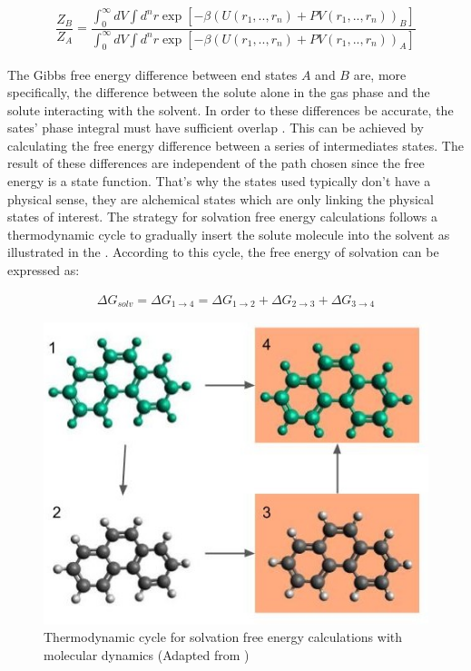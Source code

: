 \begin{equation}
\label{eq:partiso}
\begin{aligned}
\dfrac{Z_{B}}{Z_{A}} = \dfrac{\int_{0}^{\infty} dV \int d^{n}r \exp \left[ -\beta \left(U(r_{1},..,r_{n}) + PV(r_{1},..,r_{n}) \right)_{B} \right]}{\int_{0}^{\infty} dV \int d^{n}r \exp \left[ -\beta \left(U(r_{1},..,r_{n}) + PV(r_{1},..,r_{n}) \right)_{A} \right]}
\end{aligned}
\end{equation}

The Gibbs free energy difference between end states $A$ and $B$ are, more specifically, the difference between the solute alone in the gas phase and the solute interacting with the solvent. In order to these differences be accurate, the sates' phase integral must have sufficient overlap  \cite{klimovich}. This can be achieved by calculating the free energy difference between a series of intermediates states. The result of these differences are independent of the path chosen since the free energy is a state function. That's why the states used typically don't have a physical sense, they are alchemical states which are only linking the physical states of interest. The strategy for solvation free energy calculations follows a thermodynamic cycle to gradually insert the solute molecule into the solvent as illustrated in the . According to this cycle, the free energy of solvation can be expressed as:

\begin{equation}
\label{eq:freesolv}
\begin{aligned}
\Delta G_{solv} = \Delta G_{1 \rightarrow 4} = \Delta G_{1 \rightarrow 2} + \Delta G_{2 \rightarrow 3} + \Delta G_{3 \rightarrow 4}  
\end{aligned}
\end{equation}

\begin{figure}[th]
\centering
\includegraphics[scale=0.6]{Figures/cicclotermo.jpg}
\caption{Thermodynamic cycle for solvation free energy calculations with molecular dynamics (Adapted from )}
\label{thermcy}
\end{figure}

